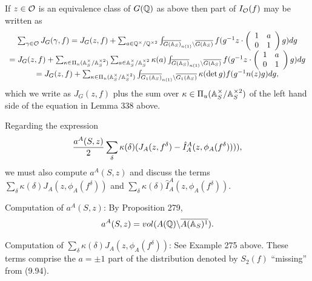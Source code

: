 If $z\in {\cal{O}}$ is an equivalence class of $G({\Bbb{Q}})$
as above then part of $I_{\cal{O}}(f)$ may be written as
\begin{equation}
\begin{array}{c}
\sum_{\gamma\in {\cal{O}}} J_G(\gamma,f)
=J_G(z,f)+\sum_{a\in {\Bbb{Q}}^{\times}/{\Bbb{Q}}^{\times 2}}
\int_{\overline{G({\Bbb{A}}_S)}_{n(1)}
\backslash \overline{G({\Bbb{A}}_S)}} f(g^{-1} z\cdot
\left(
\begin{array}{cc}
1 & a\\
0 & 1
\end{array}
\right)
g)dg\\
=J_G(z,f)+
\sum_{\kappa \in \Pi_u({\Bbb{A}}_S^{\times}/{\Bbb{A}}_S^{\times 2})}
\sum_{a \in {\Bbb{A}}_S^{\times}/{\Bbb{A}}_S^{\times 2}}
\kappa (a)
\int_{\overline{G({\Bbb{A}}_S)}_{n(1)}
\backslash \overline{G({\Bbb{A}}_S)}} f(g^{-1} z\cdot
\left(
\begin{array}{cc}
1 & a\\
0 & 1
\end{array}
\right)
g)dg\\
=J_G(z,f)+
\sum_{\kappa \in \Pi_u({\Bbb{A}}_S^{\times}/{\Bbb{A}}_S^{\times 2})}
\int_{\overline{G_1({\Bbb{A}}_S)}_{n(1)}
\backslash \overline{G_1({\Bbb{A}}_S)}} \kappa(\det{g})
f(g^{-1} n(z) g)dg,
\end{array}
\end{equation}
which we write as $J_G(z,f)$ plus the sum over
$\kappa \in \Pi_u({\Bbb{A}}_S^{\times}/{\Bbb{A}}_S^{\times 2})$
of the left hand side of the equation in Lemma 338 above.

Regarding the expression
\[
{a^A(S,z)\over 2}
\sum_\delta \kappa(\delta)
(J_A(z,f^\delta)-\hat{I}_A^A(z,\phi_A(f^\delta)))),
\]
we must also compute $a^A(S,z)$ and discuss the terms
$\sum_\delta \kappa(\delta)J_A(z,\phi_A(f^\delta))$ and
$\sum_\delta \kappa(\delta)\hat{I}_A^A(z,\phi_A(f^\delta))$.

Computation of $a^A(S,z)$: By Proposition 279,
\[
a^A(S,z)=vol(A({\Bbb{Q}})\backslash \overline{A({\Bbb{A}}_S)^1}).
\]

Computation of
$\sum_\delta \kappa(\delta)J_A(z,\phi_A(f^\delta))$:
See Example 275 above. These terms
comprise the $a=\pm 1$ part of the distribution denoted by
$S_2(f)$ ``missing'' from (9.94).

